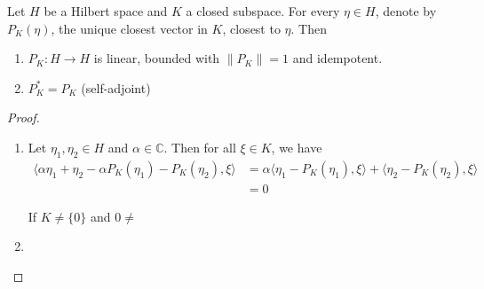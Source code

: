 \begin{theorem}
  Let $H$ be a Hilbert space and $K$ a closed subspace. For every
  $\eta \in H$, denote by $P_K(\eta)$, the unique closest vector in
  $K$, closest to $\eta$. Then
  \begin{enumerate}[label=(\arabic*)]
    \item $P_K: H \to H$ is linear, bounded with $\|P_K\| = 1$ and idempotent.
    \item $P_K^* = P_K$ (self-adjoint)
  \end{enumerate}
\end{theorem}
\begin{proof}
  \begin{enumerate}[label=(\arabic*)]
    \item Let $\eta_1, \eta_2 \in H$ and $\alpha \in \mathbb{C}$.
      Then for all $\xi \in K$, we have
      \begin{align*}
        \langle  \alpha \eta_1
        +\eta_2 - \alpha P_K( \eta_1) - P_K(\eta_2) , \xi \rangle &=
        \alpha \langle \eta_1 - P_K(\eta_1) , \xi  \rangle + \langle
        \eta_2 - P_K(\eta_2) , \xi  \rangle  \\
        &= 0
      \end{align*}

      If $K \neq \{ 0\}$ and $0 \neq $
    \item
  \end{enumerate}
\end{proof}

